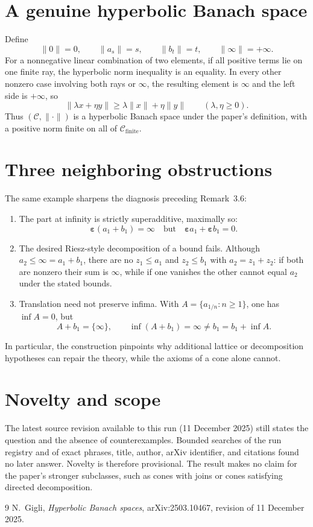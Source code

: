 \documentclass[11pt]{article}
\newcommand{\C}{\mathcal C}
\newcommand{\Fin}{\mathcal C_{\mathrm{finite}}}
\newcommand{\epsp}{\boldsymbol\varepsilon}
\newcommand{\topel}{\boldsymbol\infty}
\begin{document}
\section{A genuine hyperbolic Banach space}

Define
\[
 \lVert0\rVert=0,\qquad
 \lVert a_s\rVert=s,\qquad
 \lVert b_t\rVert=t,\qquad
 \lVert\topel\rVert=+\infty.
\]
For a nonnegative linear combination of two elements, if all positive terms
lie on one finite ray, the hyperbolic norm inequality is an equality.  In
every other nonzero case involving both rays or $\topel$, the resulting
element is $\topel$ and the left side is $+\infty$, so
\[
 \lVert\lambda x+\eta y\rVert
 \geq\lambda\lVert x\rVert+\eta\lVert y\rVert
 \qquad(\lambda,\eta\geq0).
\]
Thus $(\C,\lVert\cdot\rVert)$ is a hyperbolic Banach space under the
paper's definition, with a positive norm finite on all of $\Fin$.

\section{Three neighboring obstructions}

The same example sharpens the diagnosis preceding Remark~3.6:
\begin{enumerate}
\item The part at infinity is strictly superadditive, maximally so:
\[
 \epsp(a_1+b_1)=\topel
 \quad\text{but}\quad
 \epsp a_1+\epsp b_1=0.
\]
\item The desired Riesz-style decomposition of a bound fails.  Although
$a_2\leq\topel=a_1+b_1$, there are no $z_1\leq a_1$ and $z_2\leq b_1$
with $a_2=z_1+z_2$: if both are nonzero their sum is $\topel$, while if
one vanishes the other cannot equal $a_2$ under the stated bounds.
\item Translation need not preserve infima.  With
$A=\{a_{1/n}:n\geq1\}$, one has $\inf A=0$, but
\[
 A+b_1=\{\topel\},\qquad
 \inf(A+b_1)=\topel\ne b_1=b_1+\inf A.
\]
\end{enumerate}
In particular, the construction pinpoints why additional lattice or
decomposition hypotheses can repair the theory, while the axioms of a cone
alone cannot.

\section*{Novelty and scope}

The latest source revision available to this run (11 December 2025) still
states the question and the absence of counterexamples.  Bounded searches
of the run registry and of exact phrases, title, author, arXiv identifier,
and citations found no later answer.  Novelty is therefore provisional.
The result makes no claim for the paper's stronger subclasses, such as cones
with joins or cones satisfying directed decomposition.

\begin{thebibliography}{9}
N.~Gigli, \emph{Hyperbolic Banach spaces}, arXiv:2503.10467,
revision of 11 December 2025.
\end{thebibliography}
\end{document}
